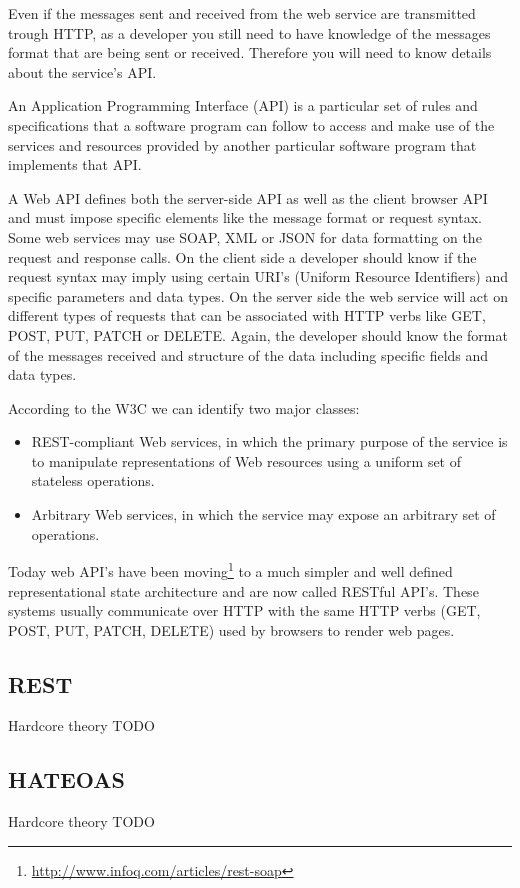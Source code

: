Even if the messages sent and received from the web service are transmitted trough HTTP, as a developer you still need to have knowledge of the messages format that are being sent or received. Therefore you will need to know details about the service's API.

An Application Programming Interface (API) is a particular
set of rules and specifications that a software program can follow to access and make use of the services
and resources provided by another particular software program that implements that API.

A Web API defines both the server-side API as well as the client browser API and must impose specific elements like the message format or request syntax. Some web services may use SOAP, XML or JSON for data formatting on the request and response calls. On the client side a developer should know if the request syntax may imply using certain URI's (Uniform Resource Identifiers) and specific parameters and data types. On the server side the web service will act on different types of requests that can be associated with HTTP verbs like GET, POST, PUT, PATCH or DELETE. Again, the developer should know the format of the messages received and structure of the data including specific fields and data types.

According to the W3C \cite{W3C} we can identify two major classes:
\begin{itemize}
	\item REST-compliant Web services, in which the primary purpose of the service is to manipulate representations of Web resources using a uniform set of stateless operations.
	\item Arbitrary Web services, in which the service may expose an arbitrary set of operations. 
\end{itemize}

Today web API's have been moving\footnote{\url{http://www.infoq.com/articles/rest-soap}} to a much simpler and well defined representational state architecture and are now called RESTful API's. These systems usually communicate over HTTP with the same HTTP verbs (GET, POST, PUT, PATCH, DELETE) used by browsers to render web pages.

\subsection{REST}
\label{sub-sec:rest}

Hardcore theory TODO
\texttt{}
\subsection{HATEOAS}
\label{sub-sec:hateoas}

Hardcore theory TODO